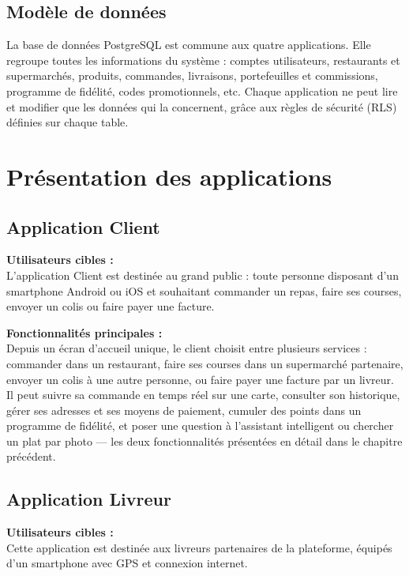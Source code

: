 \documentclass[12pt,fleqn,a4paper]{report}
\begin{document}
\begin{justify}
\subsection{Modèle de données}

La base de données PostgreSQL est commune aux quatre applications. Elle regroupe toutes les informations du système : comptes utilisateurs, restaurants et supermarchés, produits, commandes, livraisons, portefeuilles et commissions, programme de fidélité, codes promotionnels, etc. Chaque application ne peut lire et modifier que les données qui la concernent, grâce aux règles de sécurité (RLS) définies sur chaque table.

\section{Présentation des applications}

\subsection{Application Client}
\textbf{Utilisateurs cibles :}\\
L'application Client est destinée au grand public : toute personne disposant d'un smartphone Android ou iOS et souhaitant commander un repas, faire ses courses, envoyer un colis ou faire payer une facture.

\vspace{0.3cm}
\textbf{Fonctionnalités principales :}\\
Depuis un écran d'accueil unique, le client choisit entre plusieurs services : commander dans un restaurant, faire ses courses dans un supermarché partenaire, envoyer un colis à une autre personne, ou faire payer une facture par un livreur. Il peut suivre sa commande en temps réel sur une carte, consulter son historique, gérer ses adresses et ses moyens de paiement, cumuler des points dans un programme de fidélité, et poser une question à l'assistant intelligent ou chercher un plat par photo — les deux fonctionnalités présentées en détail dans le chapitre précédent.

\subsection{Application Livreur}
\textbf{Utilisateurs cibles :}\\
Cette application est destinée aux livreurs partenaires de la plateforme, équipés d'un smartphone avec GPS et connexion internet.


\end{justify}
\end{document}
